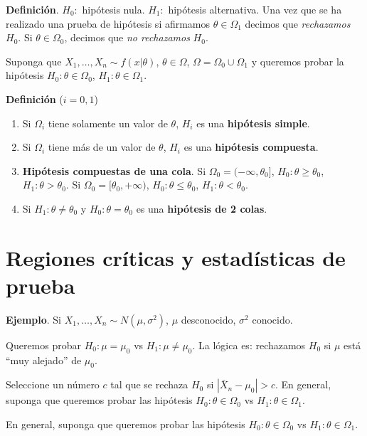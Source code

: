 \documentclass[
  12pt,
]{book}
\begin{document}
\textbf{Definición}. \(H_0:\) hipótesis nula. \(H_1:\) hipótesis alternativa. Una vez que
se ha realizado una prueba de hipótesis si afirmamos \(\theta \in \Omega_1\)
decimos que \emph{rechazamos} \(H_0\). Si \(\theta \in \Omega_0\), decimos que \emph{no
rechazamos} \(H_0\).

Suponga que \(X_1,\dots, X_n\sim f(x|\theta)\), \(\theta \in \Omega\),
\(\Omega = \Omega_0 \cup\Omega_1\) y queremos probar la hipótesis
\(H_0: \theta \in \Omega_0\), \(H_1: \theta \in \Omega_1\).

\textbf{Definición} (\(i = 0,1\))

\begin{enumerate}
\def\labelenumi{\arabic{enumi}.}
\item
  Si \(\Omega_i\) tiene solamente un valor de \(\theta\), \(H_i\) es una \textbf{hipótesis
  simple}.
\item
  Si \(\Omega_i\) tiene más de un valor de \(\theta\), \(H_i\) es una \textbf{hipótesis
  compuesta}.
\item
  \textbf{Hipótesis compuestas de una cola}. Si \(\Omega_0 = (-\infty,\theta_0]\),
  \(H_0: \theta\geq \theta_0\), \(H_1: \theta >\theta_0\). Si \(\Omega_0 = [\theta_0,+\infty)\), \(H_0: \theta\leq \theta_0\), \(H_1: \theta<\theta_0\).
\item
  Si \(H_1: \theta \ne \theta_0\) y \(H_0: \theta = \theta_0\) es una \textbf{hipótesis
  de 2 colas}.
\end{enumerate}

\hypertarget{regiones-cruxedticas-y-estaduxedsticas-de-prueba}{%
\section{Regiones críticas y estadísticas de prueba}\label{regiones-cruxedticas-y-estaduxedsticas-de-prueba}}

\textbf{Ejemplo}. Si \(X_1,\dots, X_n \sim N(\mu,\sigma^2)\), \(\mu\) desconocido,
\(\sigma^2\) conocido.

Queremos probar \(H_0: \mu = \mu_0\) vs \(H_1: \mu\neq \mu_0\). La lógica es:
rechazamos \(H_0\) si \(\mu\) está ``muy alejado'' de \(\mu_0\).

Seleccione un número \(c\) tal que se rechaza \(H_0\) si \(|\bar X_n -\mu_0|>c\). En
general, suponga que queremos probar las hipótesis \(H_0: \theta \in \Omega_0\) vs
\(H_1: \theta\in \Omega_1\).

En general, suponga que queremos probar las hipótesis \(H_0: \theta \in \Omega_0\)
vs \(H_1: \theta \in \Omega_1\).
\end{document}
